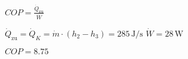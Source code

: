 \( COP = \frac{\dot{Q}_{\text{zu}}}{\dot{W}} \)  

\( \dot{Q}_{\text{zu}} = \dot{Q}_K = \dot{m} \cdot (h_2 - h_3) = 285 \, \text{J/s} \)  
\( \dot{W} = 28 \, \text{W} \)  

\( COP = 8.75 \)